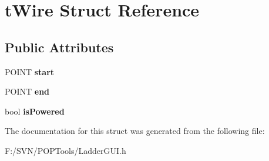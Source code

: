 \hypertarget{structt_wire}{\section{t\-Wire Struct Reference}
\label{structt_wire}
}
\subsection*{Public Attributes}
\begin{DoxyCompactItemize}
\item 
\hypertarget{structt_wire_a0f5fa5455a448a960b28ac4db6d2358e}{P\-O\-I\-N\-T {\bfseries start}}\label{structt_wire_a0f5fa5455a448a960b28ac4db6d2358e}

\item 
\hypertarget{structt_wire_af5daadc759699ae288505df7c7f135fe}{P\-O\-I\-N\-T {\bfseries end}}\label{structt_wire_af5daadc759699ae288505df7c7f135fe}

\item 
\hypertarget{structt_wire_a13901acec75f5661d87039c93c5f0d7f}{bool {\bfseries is\-Powered}}\label{structt_wire_a13901acec75f5661d87039c93c5f0d7f}

\end{DoxyCompactItemize}


The documentation for this struct was generated from the following file\-:\begin{DoxyCompactItemize}
\item 
F\-:/\-S\-V\-N/\-P\-O\-P\-Tools/Ladder\-G\-U\-I.\-h\end{DoxyCompactItemize}
